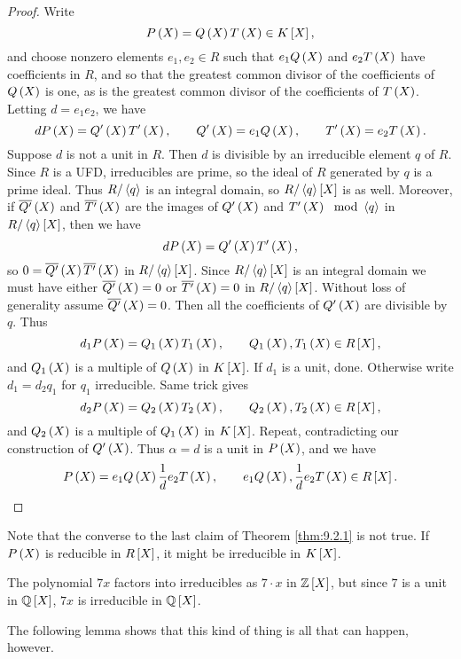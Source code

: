 \begin{proof}
Write
$$ P\rb{X} = Q\rb{X}T\rb{X} \in K\sb{X}, $$
and choose nonzero elements $ e_1, e_2 \in R $ such that $ e_1Q\rb{X} $ and $ e_2T\rb{X} $ have coefficients in $ R $, and so that the greatest common divisor of the coefficients of $ Q\rb{X} $ is one, as is the greatest common divisor of the coefficients of $ T\rb{X} $. Letting $ d = e_1e_2 $, we have
$$ dP\rb{X} = Q'\rb{X}T'\rb{X}, \qquad Q'\rb{X} = e_1Q\rb{X}, \qquad T'\rb{X} = e_2T\rb{X}. $$
Suppose $ d $ is not a unit in $ R $. Then $ d $ is divisible by an irreducible element $ q $ of $ R $. Since $ R $ is a UFD, irreducibles are prime, so the ideal of $ R $ generated by $ q $ is a prime ideal. Thus $ R / \ab{q} $ is an integral domain, so $ R / \ab{q}\sb{X} $ is as well. Moreover, if $ \overline{Q'}\rb{X} $ and $ \overline{T'}\rb{X} $ are the images of $ Q'\rb{X} $ and $ T'\rb{X} \mod \ab{q} $ in $ R / \ab{q}\sb{X} $, then we have
$$ dP\rb{X} = Q'\rb{X}T'\rb{X}, $$
so $ 0 = \overline{Q'}\rb{X}\overline{T'}\rb{X} $ in $ R / \ab{q}\sb{X} $. Since $ R / \ab{q}\sb{X} $ is an integral domain we must have either $ \overline{Q'}\rb{X} = 0 $ or $ \overline{T'}\rb{X} = 0 $ in $ R / \ab{q}\sb{X} $. Without loss of generality assume $ \overline{Q'}\rb{X} = 0 $. Then all the coefficients of $ Q'\rb{X} $ are divisible by $ q $. Thus
$$ d_1P\rb{X} = Q_1\rb{X}T_1\rb{X}, \qquad Q_1\rb{X}, T_1\rb{X} \in R\sb{X}, $$
and $ Q_1\rb{X} $ is a multiple of $ Q\rb{X} $ in $ K\sb{X} $. If $ d_1 $ is a unit, done. Otherwise write $ d_1 = d_2q_1 $ for $ q_1 $ irreducible. Same trick gives
$$ d_2P\rb{X} = Q_2\rb{X}T_2\rb{X}, \qquad Q_2\rb{X}, T_2\rb{X} \in R\sb{X}, $$
and $ Q_2\rb{X} $ is a multiple of $ Q_1\rb{X} $ in $ K\sb{X} $. Repeat, contradicting our construction of $ Q'\rb{X} $. Thus $ \alpha = d $ is a unit in $ P\rb{X} $, and we have
$$ P\rb{X} = e_1Q\rb{X}\dfrac{1}{d}e_2T\rb{X}, \qquad e_1Q\rb{X}, \dfrac{1}{d}e_2T\rb{X} \in R\sb{X}. $$
\end{proof}

Note that the converse to the last claim of Theorem \ref{thm:9.2.1} is not true. If $ P\rb{X} $ is reducible in $ R\sb{X} $, it might be irreducible in $ K\sb{X} $.

\begin{example2}
The polynomial $ 7x $ factors into irreducibles as $ 7 \cdot x $ in $ \Z\sb{X} $, but since $ 7 $ is a unit in $ \Q\sb{X} $, $ 7x $ is irreducible in $ \Q\sb{X} $.
\end{example2}

The following lemma shows that this kind of thing is all that can happen, however.

